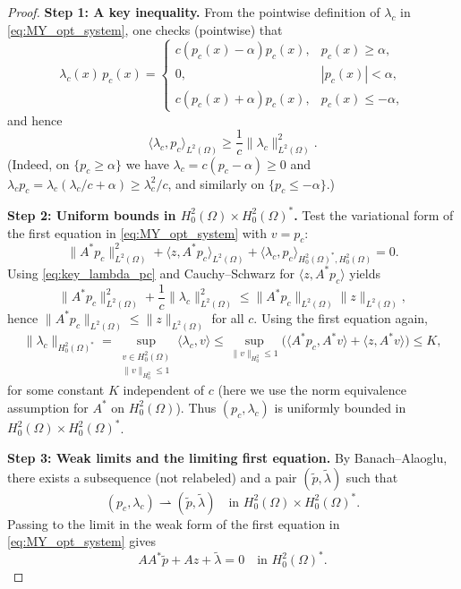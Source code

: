 \documentclass[11pt,a4paper]{article}
\begin{document}
\begin{proof}

\medskip\noindent
\textbf{Step 1: A key inequality.}
From the pointwise definition of $\lambda_c$ in \eqref{eq:MY_opt_system},
one checks (pointwise) that
\[
\lambda_c(x)\,p_c(x)=
\begin{cases}
c(p_c(x)-\alpha)p_c(x), & p_c(x)\ge \alpha,\\
0, & |p_c(x)|<\alpha,\\
c(p_c(x)+\alpha)p_c(x), & p_c(x)\le -\alpha,
\end{cases}
\]
and hence
\begin{equation}\label{eq:key_lambda_pc}
\langle \lambda_c,p_c\rangle_{L^2(\Omega)} \ge \frac1c\|\lambda_c\|_{L^2(\Omega)}^2.
\end{equation}
(Indeed, on $\{p_c\ge\alpha\}$ we have $\lambda_c=c(p_c-\alpha)\ge 0$ and $\lambda_c p_c = \lambda_c(\lambda_c/c+\alpha)\ge \lambda_c^2/c$, and similarly on $\{p_c\le -\alpha\}$.)

\medskip\noindent
\textbf{Step 2: Uniform bounds in $H^2_0(\Omega)\times H^2_0(\Omega)^\ast$.}
Test the variational form of the first equation in \eqref{eq:MY_opt_system} with $v=p_c$:
\[
\|A^\ast p_c\|_{L^2(\Omega)}^2 + \langle z, A^\ast p_c\rangle_{L^2(\Omega)}
+ \langle \lambda_c, p_c\rangle_{H^2_0(\Omega)^\ast,H^2_0(\Omega)} = 0.
\]
Using \eqref{eq:key_lambda_pc} and Cauchy--Schwarz for $\langle z, A^\ast p_c\rangle$ yields
\[
\|A^\ast p_c\|_{L^2(\Omega)}^2 + \frac1c\|\lambda_c\|_{L^2(\Omega)}^2
\le \|A^\ast p_c\|_{L^2(\Omega)}\|z\|_{L^2(\Omega)},
\]
hence $\|A^\ast p_c\|_{L^2(\Omega)}\le \|z\|_{L^2(\Omega)}$ for all $c$.
Using the first equation again,
\[
\|\lambda_c\|_{H^2_0(\Omega)^\ast}
= \sup_{\substack{v\in H^2_0(\Omega)\\ \|v\|_{H^2_0}\le 1}}
\langle \lambda_c, v\rangle
\le 
\sup_{\|v\|_{H^2_0}\le 1} \bigl(\langle A^\ast p_c, A^\ast v\rangle + \langle z, A^\ast v\rangle \bigr)
\le K,
\]
for some constant $K$ independent of $c$ (here we use the norm equivalence assumption for $A^\ast$ on $H^2_0(\Omega)$).
Thus $(p_c,\lambda_c)$ is uniformly bounded in $H^2_0(\Omega)\times H^2_0(\Omega)^\ast$.

\medskip\noindent
\textbf{Step 3: Weak limits and the limiting first equation.}
By Banach--Alaoglu, there exists a subsequence (not relabeled) and a pair $(\tilde p,\tilde\lambda)$ such that
\[
(p_c,\lambda_c)\rightharpoonup (\tilde p,\tilde\lambda)
\quad\text{in }H^2_0(\Omega)\times H^2_0(\Omega)^\ast.
\]
Passing to the limit in the weak form of the first equation in \eqref{eq:MY_opt_system} gives
\begin{equation}\label{eq:limit_first_eq}
AA^\ast \tilde p + Az + \tilde\lambda = 0
\quad\text{in }H^2_0(\Omega)^\ast.
\end{equation}


\end{proof}
\end{document}
